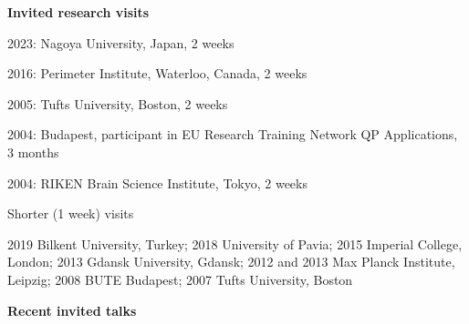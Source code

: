 \documentclass[12pt]{article}
\begin{document}
%


\noindent
\textbf{Invited research visits}
\begin{description}
\item{2023:} Nagoya University, Japan, 2 weeks
\item{2016:} Perimeter Institute, Waterloo, Canada, 2 weeks
\item{2005:} Tufts University, Boston, 2 weeks 
\item{2004:} Budapest, participant in EU Research Training Network QP Applications, 3 months
\item{2004:} RIKEN Brain Science Institute, Tokyo, 2 weeks

\item{Shorter (1 week) visits}

2019 Bilkent University, Turkey; 2018 University of Pavia; 2015 Imperial College, London; 2013 Gdansk University, Gdansk; 2012 and 2013 Max Planck Institute, Leipzig;
2008 BUTE Budapest; 2007 Tufts University, Boston

\end{description}

\noindent
\textbf{Recent invited talks}
\end{document}
